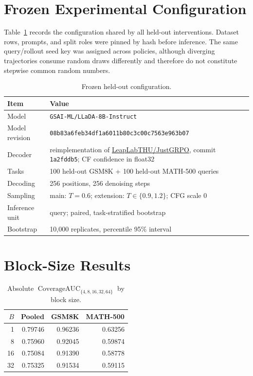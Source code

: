 \documentclass[11pt]{article}
\newcommand{\cauc}{\operatorname{CoverageAUC}}
\newcommand{\gsm}{GSM8K}
\newcommand{\mathfive}{MATH-500}
\begin{document}
\appendix

\section{Frozen Experimental Configuration}
\label{app:protocol}

Table~\ref{tab:config} records the configuration shared by all held-out interventions. Dataset rows, prompts, and split roles were pinned by hash before inference. The same query/rollout seed key was assigned across policies, although diverging trajectories consume random draws differently and therefore do not constitute stepwise common random numbers.

\begin{table}[h]
\caption{Frozen held-out configuration.}
\label{tab:config}
\centering
\small
\begin{tabular}{@{}p{2.0cm}p{4.9cm}@{}}
\toprule
Item & Value \\
\midrule
Model & \texttt{GSAI-ML/LLaDA-8B-Instruct} \\
Model revision & \texttt{08b83a6f}\allowbreak\texttt{eb34df1a}\allowbreak\texttt{6011b80c}\allowbreak\texttt{3c00c756}\allowbreak\texttt{3e963b07} \\
Decoder & reimplementation of \url{LeapLabTHU/JustGRPO}, commit \texttt{1a2fddb5}; CF confidence in float32 \\
Tasks & 100 held-out \gsm{} + 100 held-out \mathfive{} queries \\
Decoding & 256 positions, 256 denoising steps \\
Sampling & main: $T=0.6$; extension: $T\in\{0.9,1.2\}$; CFG scale 0 \\
Inference unit & query; paired, task-stratified bootstrap \\
Bootstrap & 10,000 replicates, percentile 95\% interval \\
\bottomrule
\end{tabular}
\end{table}

\section{Block-Size Results}

\begin{table}[h]
\caption{Absolute $\cauc_{\{4,8,16,32,64\}}$ by block size.}
\centering
\begin{tabular}{rrrr}
\toprule
$B$ & Pooled & \gsm{} & \mathfive{} \\
\midrule
1  & 0.79746 & 0.96236 & 0.63256 \\
8  & 0.75960 & 0.92045 & 0.59874 \\
16 & 0.75084 & 0.91390 & 0.58778 \\
32 & 0.75325 & 0.91534 & 0.59115 \\
\bottomrule
\end{tabular}
\end{table}
\end{document}
